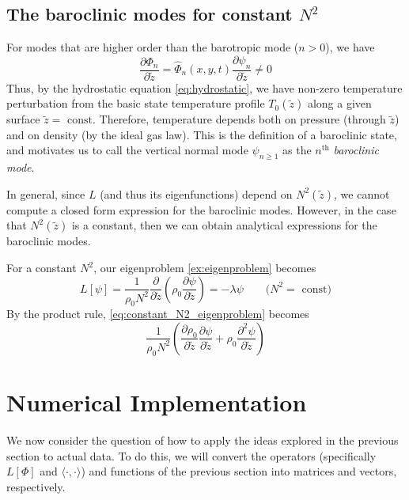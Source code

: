 \documentclass{article}
\numberwithin{equation}{section}
\newcommand{\z}{\tilde{z}}
\begin{document}
\subsection{The baroclinic modes for constant $N^2$}
For modes that are higher order than the barotropic mode ($n>0$), we have
\begin{equation}
  \frac{\partial\Phi_n}{\partial \z}=\hat\Phi_n(x,y,t)\frac{\partial\psi_n}{\partial\z}\neq 0 
\end{equation}
Thus, by the hydrostatic equation \eqref{eq:hydrostatic}, we have non-zero temperature perturbation from the basic state temperature profile $T_0(\z)$ along a given surface $\z=\text{ const.}$ Therefore, temperature depends both on pressure (through $\z$) and on density (by the ideal gas law). This is the definition of a baroclinic state, and motivates us to call the vertical normal mode $\psi_{n\geq1}$ as the $n^{\text{th}}$ \textit{baroclinic mode}. 
\par In general, since $L$ (and thus its eigenfunctions) depend on $N^2(\z)$, we cannot compute a closed form expression for the baroclinic modes. However, in the case that $N^2(\z)$ is a constant, then we can obtain analytical expressions for the baroclinic modes.
\par For a constant $N^2$, our eigenproblem \eqref{ex:eigenproblem} becomes
\begin{equation}
  \label{eq:constant_N2_eigenproblem}
  L[\psi] = \frac{1}{\rho_0N^2}\frac{\partial}{\partial \z}\left(\rho_0\frac{\partial\psi}{\partial\z}\right)=-\lambda\psi \qquad \text{($N^2 = $ const)}
\end{equation}
%
By the product rule, \eqref{eq:constant_N2_eigenproblem} becomes
\begin{equation}
  \frac{1}{\rho_0N^2}\left(\frac{\partial\rho_0}{\partial\z}\frac{\partial\psi}{\partial\z}+\rho_0\frac{\partial^2\psi}{\partial\z}\right)
\end{equation}





\section{Numerical Implementation}
We now consider the question of how to apply the ideas explored in the previous section to actual data. To do this, we will convert the operators (specifically $L[\Phi]$ and $\langle\cdot,\cdot\rangle$) and functions of the previous section into matrices and vectors, respectively. 
\end{document}
